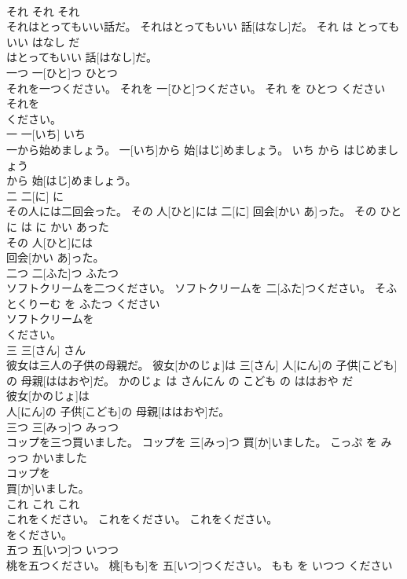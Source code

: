 \documentclass[8pt]{extreport}
\begin{document}
\begin{CJK}{UTF8}{min}
\\	それ	それ	それ	
\\	それはとってもいい話だ。	それはとってもいい 話[はなし]だ。	それ は とっても いい はなし だ	
\\	はとってもいい 話[はなし]だ。			
\\	一つ	一[ひと]つ	ひとつ	
\\	それを一つください。	それを 一[ひと]つください。	それ を ひとつ ください	
\\	それを
\\	ください。			
\\	一	一[いち]	いち	
\\	一から始めましょう。	一[いち]から 始[はじ]めましょう。	いち から はじめましょう	
\\	から 始[はじ]めましょう。			
\\	二	二[に]	に	
\\	その人には二回会った。	その 人[ひと]には 二[に] 回会[かい あ]った。	その ひと に は に かい あった	
\\	その 人[ひと]には
\\	回会[かい あ]った。			
\\	二つ	二[ふた]つ	ふたつ	
\\	ソフトクリームを二つください。	ソフトクリームを 二[ふた]つください。	そふとくりーむ を ふたつ ください	
\\	ソフトクリームを
\\	ください。			
\\	三	三[さん]	さん	
\\	彼女は三人の子供の母親だ。	彼女[かのじょ]は 三[さん] 人[にん]の 子供[こども]の 母親[ははおや]だ。	かのじょ は さんにん の こども の ははおや だ	
\\	彼女[かのじょ]は
\\	人[にん]の 子供[こども]の 母親[ははおや]だ。			
\\	三つ	三[みっ]つ	みっつ	
\\	コップを三つ買いました。	コップを 三[みっ]つ 買[か]いました。	こっぷ を みっつ かいました	
\\	コップを
\\	買[か]いました。			
\\	これ	これ	これ	
\\	これをください。	これをください。	これをください。	
\\	をください。			
\\	五つ	五[いつ]つ	いつつ	
\\	桃を五つください。	桃[もも]を 五[いつ]つください。	もも を いつつ ください	

\end{CJK}
\end{document}
